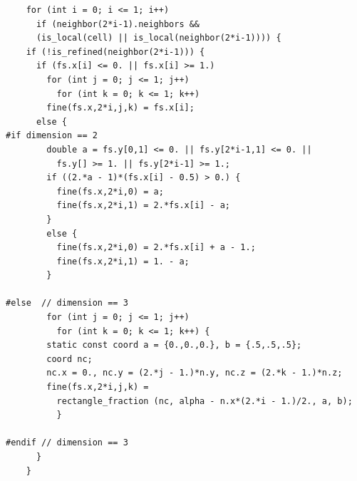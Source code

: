 \documentclass[a4paper]{article}
\begin{document}
\begin{multicols}{2}
 \columnbreak
 \begin{verbatim}
    for (int i = 0; i <= 1; i++)
      if (neighbor(2*i-1).neighbors &&
	  (is_local(cell) || is_local(neighbor(2*i-1)))) {
	if (!is_refined(neighbor(2*i-1))) {
	  if (fs.x[i] <= 0. || fs.x[i] >= 1.)
	    for (int j = 0; j <= 1; j++)
	      for (int k = 0; k <= 1; k++)
		fine(fs.x,2*i,j,k) = fs.x[i];
	  else {
#if dimension == 2
	    double a = fs.y[0,1] <= 0. || fs.y[2*i-1,1] <= 0. ||
	      fs.y[] >= 1. || fs.y[2*i-1] >= 1.;
	    if ((2.*a - 1)*(fs.x[i] - 0.5) > 0.) {
	      fine(fs.x,2*i,0) = a;
	      fine(fs.x,2*i,1) = 2.*fs.x[i] - a;
	    }
	    else {
	      fine(fs.x,2*i,0) = 2.*fs.x[i] + a - 1.;
	      fine(fs.x,2*i,1) = 1. - a;
	    }

#else  // dimension == 3
	    for (int j = 0; j <= 1; j++)
	      for (int k = 0; k <= 1; k++) {
		static const coord a = {0.,0.,0.}, b = {.5,.5,.5};
		coord nc;
		nc.x = 0., nc.y = (2.*j - 1.)*n.y, nc.z = (2.*k - 1.)*n.z;
		fine(fs.x,2*i,j,k) =
		  rectangle_fraction (nc, alpha - n.x*(2.*i - 1.)/2., a, b);
	      }

#endif // dimension == 3
	  }
	}
 \end{verbatim}
\end{multicols}

\begin{center}
\end{center}
\end{document}
